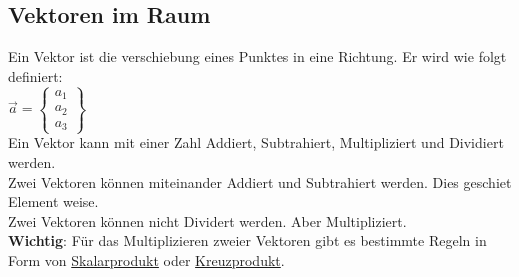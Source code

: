 \subsection{Vektoren im Raum}
Ein Vektor ist die verschiebung eines Punktes in eine Richtung.
Er wird wie folgt definiert: \\
$
\vec{a} =
\begin{Bmatrix}
    a_1 \\ a_2 \\ a_3
\end{Bmatrix}
$ \\
Ein Vektor kann mit einer Zahl Addiert, Subtrahiert, Multipliziert und Dividiert werden. \\
Zwei Vektoren können miteinander Addiert und Subtrahiert werden. Dies geschiet Element weise. \\
Zwei Vektoren können nicht Dividert werden. Aber Multipliziert. \\
\textbf{Wichtig}: Für das Multiplizieren zweier Vektoren gibt es bestimmte Regeln in Form von 
\hyperref[sec:skalarprodukt]{Skalarprodukt}
oder 
\hyperref[sec:kreuzprodukt]{Kreuzprodukt}. 

